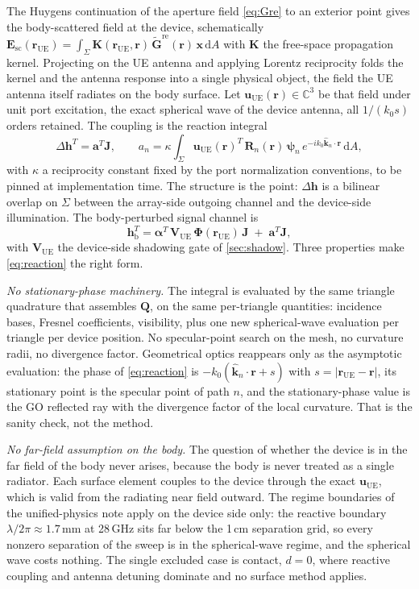 \documentclass[11pt]{article}
\newcommand{\khat}{\hat{\bm{k}}}
\newcommand{\rr}{\mathbf{r}}
\newcommand{\xx}{\mathbf{x}}
\newcommand{\hh}{\mathbf{h}}
\newcommand{\Gtil}{\tilde{\mathbf{G}}}
\newcommand{\Gre}{\Gtil^{\mathrm{re}}}
\newcommand{\Qmat}{\mathbf{Q}}
\newcommand{\Jmat}{\mathbf{J}}
\newcommand{\Phimat}{\mathbf{\Phi}}
\newcommand{\Rn}{\mathbf{R}_n}
\newcommand{\psin}{\bm{\psi}_n}
\newcommand{\diff}{\mathrm{d}}
\newcommand{\Complex}{\mathbb{C}}
\newcommand{\rue}{\rr_{\mathrm{UE}}}
\newcommand{\hb}{\hh_{\mathrm{b}}}
\newcommand{\uue}{\mathbf{u}_{\mathrm{UE}}}
\theoremstyle{remark}
\begin{document}
The Huygens continuation of the aperture field \cref{eq:Gre} to an
exterior point gives the body-scattered field at the device,
schematically
$\mathbf{E}_{\mathrm{sc}}(\rue) = \int_\Sigma \mathbf{K}(\rue, \rr)\,
\Gre(\rr)\,\xx\, \diff A$ with $\mathbf{K}$ the free-space propagation
kernel. Projecting on the UE antenna and applying Lorentz reciprocity
folds the kernel and the antenna response into a single physical
object, the field the UE antenna itself radiates on the body surface.
Let $\uue(\rr) \in \Complex^3$ be that field under unit port
excitation, the exact spherical wave of the device antenna, all
$1/(k_0 s)$ orders retained. The coupling is the reaction integral
\begin{equation}\label{eq:reaction}
  \Delta\hh^{T} = \mathbf{a}^{T} \Jmat,
  \qquad
  a_n = \kappa \int_{\Sigma}
  \uue(\rr)^{T}\, \Rn(\rr)\, \psin\,
  e^{-i k_0 \khat_n \cdot \rr}\, \diff A,
\end{equation}
with $\kappa$ a reciprocity constant fixed by the port normalization
conventions, to be pinned at implementation time. The structure is
the point: $\Delta\hh$ is a bilinear overlap on $\Sigma$ between the
array-side outgoing channel and the device-side illumination. The
body-perturbed signal channel is
\begin{equation}\label{eq:hb}
  \boxed{\;
  \hb^{T}
  = \bm{\alpha}^{T}\, \mathbf{V}_{\mathrm{UE}}\, \Phimat(\rue)\, \Jmat
  \;+\; \mathbf{a}^{T} \Jmat ,
  \;}
\end{equation}
with $\mathbf{V}_{\mathrm{UE}}$ the device-side shadowing gate of
\cref{sec:shadow}. Three properties make \cref{eq:reaction} the right
form.

\emph{No stationary-phase machinery.} The integral is evaluated by
the same triangle quadrature that assembles $\Qmat$, on the same
per-triangle quantities: incidence bases, Fresnel coefficients,
visibility, plus one new spherical-wave evaluation per triangle per
device position. No specular-point search on the mesh, no curvature
radii, no divergence factor. Geometrical optics reappears only as
the asymptotic evaluation: the phase of \cref{eq:reaction} is
$-k_0(\khat_n \cdot \rr + s)$ with $s = |\rue - \rr|$, its stationary
point is the specular point of path $n$, and the stationary-phase
value is the GO reflected ray with the divergence factor of the local
curvature. That is the sanity check, not the method.

\emph{No far-field assumption on the body.} The question of whether
the device is in the far field of the body never arises, because the
body is never treated as a single radiator. Each surface element
couples to the device through the exact $\uue$, which is valid from
the radiating near field outward. The regime boundaries of the
unified-physics note apply on the device side only: the reactive
boundary $\lambda/2\pi \approx 1.7$\,mm at 28\,GHz sits far below the
1\,cm separation grid, so every nonzero separation of the sweep is in
the spherical-wave regime, and the spherical wave costs nothing. The
single excluded case is contact, $d = 0$, where reactive coupling and
antenna detuning dominate and no surface method applies.
\end{document}
